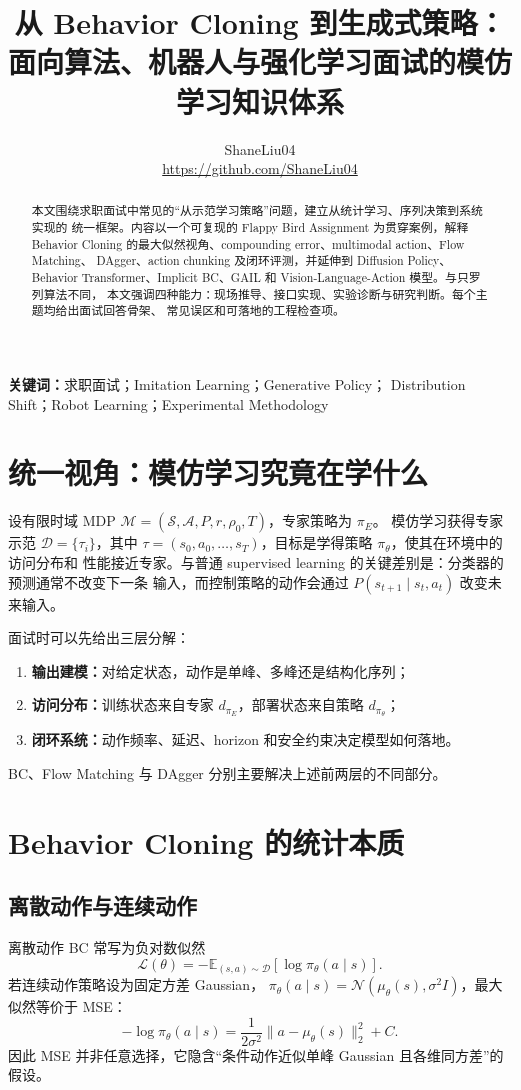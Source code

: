 \documentclass[10pt,twocolumn,a4paper]{ctexart}
\title{\vspace{-1.2em}\textbf{从 Behavior Cloning 到生成式策略：\\
面向算法、机器人与强化学习面试的模仿学习知识体系}}
\author{ShaneLiu04\\
\small\url{https://github.com/ShaneLiu04}}
\date{}
\begin{document}
\maketitle
\thispagestyle{fancy}

\begin{abstract}
本文围绕求职面试中常见的“从示范学习策略”问题，建立从统计学习、序列决策到系统实现的
统一框架。内容以一个可复现的 Flappy Bird Assignment 为贯穿案例，解释 Behavior
Cloning 的最大似然视角、compounding error、multimodal action、Flow Matching、
DAgger、action chunking 及闭环评测，并延伸到 Diffusion Policy、Behavior
Transformer、Implicit BC、GAIL 和 Vision-Language-Action 模型。与只罗列算法不同，
本文强调四种能力：现场推导、接口实现、实验诊断与研究判断。每个主题均给出面试回答骨架、
常见误区和可落地的工程检查项。
\end{abstract}

\textbf{关键词：}求职面试；Imitation Learning；Generative Policy；
Distribution Shift；Robot Learning；Experimental Methodology

\section{统一视角：模仿学习究竟在学什么}
设有限时域 MDP
$\mathcal M=(\mathcal S,\mathcal A,P,r,\rho_0,T)$，专家策略为 $\pi_E$。
模仿学习获得专家示范
$\mathcal D=\{\tau_i\}$，其中
$\tau=(s_0,a_0,\ldots,s_T)$，目标是学得策略 $\pi_\theta$，使其在环境中的访问分布和
性能接近专家。与普通 supervised learning 的关键差别是：分类器的预测通常不改变下一条
输入，而控制策略的动作会通过 $P(s_{t+1}\mid s_t,a_t)$ 改变未来输入。

面试时可以先给出三层分解：
\begin{enumerate}
  \item \textbf{输出建模：}对给定状态，动作是单峰、多峰还是结构化序列；
  \item \textbf{访问分布：}训练状态来自专家 $d_{\pi_E}$，部署状态来自策略
  $d_{\pi_\theta}$；
  \item \textbf{闭环系统：}动作频率、延迟、horizon 和安全约束决定模型如何落地。
\end{enumerate}
BC、Flow Matching 与 DAgger 分别主要解决上述前两层的不同部分。

\section{Behavior Cloning 的统计本质}
\subsection{离散动作与连续动作}
离散动作 BC 常写为负对数似然
\[
  \mathcal L(\theta)=-\mathbb E_{(s,a)\sim\mathcal D}
  [\log\pi_\theta(a\mid s)].
\]
若连续动作策略设为固定方差 Gaussian，
$\pi_\theta(a\mid s)=\mathcal N(\mu_\theta(s),\sigma^2I)$，最大似然等价于 MSE：
\[
  -\log\pi_\theta(a\mid s)=
  \frac{1}{2\sigma^2}\|a-\mu_\theta(s)\|_2^2+C.
\]
因此 MSE 并非任意选择，它隐含“条件动作近似单峰 Gaussian 且各维同方差”的假设。
\end{document}
